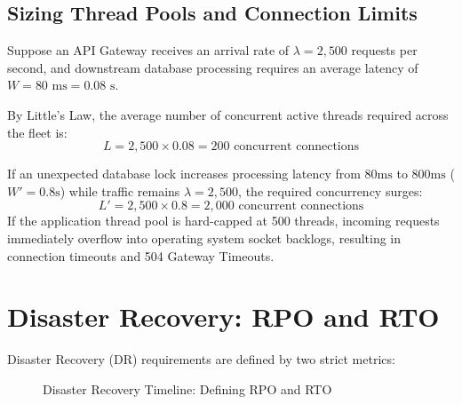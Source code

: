 \subsection{Sizing Thread Pools and Connection Limits}

Suppose an API Gateway receives an arrival rate of $\lambda = 2,500$ requests per second, and downstream database processing requires an average latency of $W = 80\text{ ms} = 0.08\text{ s}$. 

By Little's Law, the average number of concurrent active threads required across the fleet is:
\begin{equation}
L = 2,500 \times 0.08 = 200 \text{ concurrent connections}
\end{equation}

If an unexpected database lock increases processing latency from $80\text{ms}$ to $800\text{ms}$ ($W' = 0.8\text{s}$) while traffic remains $\lambda = 2,500$, the required concurrency surges:
\begin{equation}
L' = 2,500 \times 0.8 = 2,000 \text{ concurrent connections}
\end{equation}
If the application thread pool is hard-capped at 500 threads, incoming requests immediately overflow into operating system socket backlogs, resulting in connection timeouts and 504 Gateway Timeouts.

\section{Disaster Recovery: RPO and RTO}

Disaster Recovery (DR) requirements are defined by two strict metrics:

\begin{figure}[htbp]
\centering
{}
\caption{Disaster Recovery Timeline: Defining RPO and RTO}
\label{fig:rpo-rto}
\end{figure}


